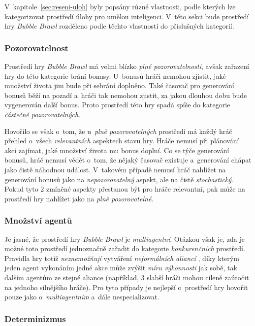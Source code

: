 V~kapitole~\ref{sec:reseni-uloh} byly popsány různé vlastnosti, podle kterých lze kategorizovat prostředí úlohy pro umělou inteligenci. V~této sekci bude prostředí hry \emph{Bubble Brawl} rozděleno podle těchto vlastností do příslušných kategorií.

\subsubsection*{Pozorovatelnost}

Prostředí hry \emph{Bubble Brawl} má velmi blízko \emph{plné pozorovatelnosti}, avšak zařazení hry do této kategorie brání bonusy. U~bonusů hráči nemohou zjistit, jaké množství života jim bude při sebrání doplněno. Také časovač pro generování bonusů běží na pozadí a~hráči tak nemohou zjistit, za jakou dlouhou dobu bude vygenerován další bonus. Proto prostředí této hry spadá spíše do kategorie \emph{částečně pozorovatelných}.

Hovořilo se však o~tom, že u~\emph{plně pozorovatelných} prostředí má každý hráč přehled o~všech \emph{relevantních} aspektech stavu hry. Hráče nemusí při plánování akcí zajímat, jaké množství života mu bonus doplní. Co se týče generování bonusů, hráč nemusí vědět o~tom, že nějaký časovač existuje a~generování chápat jako čistě náhodnou událost. V~takovém případě nemusí hráč nahlížet na generování bonusů jako na \emph{nepozorovatelný} aspekt, ale na čistě \emph{stochastický}. Pokud tyto 2 zmíněné aspekty přestanou být pro hráče relevantní, pak může na prostředí hry nahlížet jako na \emph{plně pozorovatelné}.

\subsubsection*{Množství agentů}

Je jasné, že prostředí hry \emph{Bubble Brawl} je \emph{multiagentní}. Otázkou však je, zda je možné toto prostředí jednoznačně zařadit do kategorie \emph{konkurenčních} prostředí. Pravidla hry totiž \emph{neznemožňují} vytváření \emph{neformálních aliancí} \cite[s.\,166]{AI_Russel_Norvig}, díky kterým jeden agent vykonáním jedné akce může zvýšit \emph{míru výkonnosti} jak sobě, tak dalším agentům ze stejné aliance (například, 3 slabší hráči mohou cíleně zaútočit na jednoho silnějšího hráče). Pro tyto případy je nejlepší o~prostředí hry hovořit pouze jako o~\emph{multiagentním} a~dále nespecializovat.

\subsubsection*{Determinizmus}

